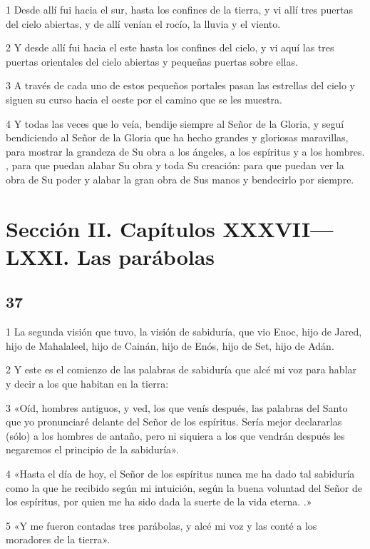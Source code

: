 \par 1 Desde allí fui hacia el sur, hasta los confines de la tierra, y vi allí tres puertas del cielo abiertas, y de allí venían el rocío, la lluvia y el viento.
\par 2 Y desde allí fui hacia el este hasta los confines del cielo, y vi aquí las tres puertas orientales del cielo abiertas y pequeñas puertas sobre ellas.
\par 3 A través de cada uno de estos pequeños portales pasan las estrellas del cielo y siguen su curso hacia el oeste por el camino que se les muestra.
\par 4 Y todas las veces que lo veía, bendije siempre al Señor de la Gloria, y seguí bendiciendo al Señor de la Gloria que ha hecho grandes y gloriosas maravillas, para mostrar la grandeza de Su obra a los ángeles, a los espíritus y a los hombres. , para que puedan alabar Su obra y toda Su creación: para que puedan ver la obra de Su poder y alabar la gran obra de Sus manos y bendecirlo por siempre.

\part{Sección II. Capítulos XXXVII—LXXI. Las parábolas}

\chapter{37}

\par 1 La segunda visión que tuvo, la visión de sabiduría, que vio Enoc, hijo de Jared, hijo de Mahalaleel, hijo de Cainán, hijo de Enós, hijo de Set, hijo de Adán.
\par 2 Y este es el comienzo de las palabras de sabiduría que alcé mi voz para hablar y decir a los que habitan en la tierra:
\par 3 «Oíd, hombres antiguos, y ved, los que venís después, las palabras del Santo que yo pronunciaré delante del Señor de los espíritus. Sería mejor declararlas (sólo) a los hombres de antaño, pero ni siquiera a los que vendrán después les negaremos el principio de la sabiduría».
\par 4 «Hasta el día de hoy, el Señor de los espíritus nunca me ha dado tal sabiduría como la que he recibido según mi intuición, según la buena voluntad del Señor de los espíritus, por quien me ha sido dada la suerte de la vida eterna. .»
\par 5 «Y me fueron contadas tres parábolas, y alcé mi voz y las conté a los moradores de la tierra».

